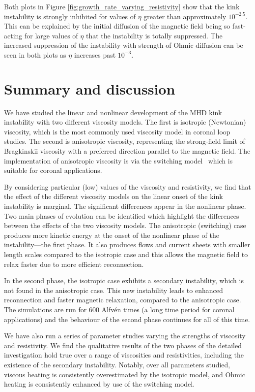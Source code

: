 Both plots in Figure \ref{fig:growth_rate_varying_resistivity} show that the kink instability is strongly inhibited for values of $\eta$ greater than approximately $10^{-2.5}$. This can be explained by the initial diffusion of the magnetic field being so fast-acting for large values of $\eta$ that the instability is totally suppressed. The increased suppression of the instability with strength of Ohmic diffusion can be seen in both plots as $\eta$ increases past $10^{-3}$.

\section{Summary and discussion}
\label{sec:conclusions}

We have studied the linear and nonlinear development of the MHD kink
instability with two different viscosity models. The first is
isotropic (Newtonian) viscosity, which is the most commonly used
viscosity model in coronal loop studies. The second is anisotropic viscosity, representing the strong-field limit of Bragkinskii viscosity with a preferred direction parallel to the magnetic field. The implementation of anisotropic viscosity is via the switching model~\cite{mactaggartBraginskiiMagnetohydrodynamicsArbitrary2017} which is suitable for coronal applications.

By considering particular (low) values of the viscosity and resistivity, we find that the effect of the different viscosity models on the linear onset of the kink instability is marginal. The significant differences appear in the nonlinear phase. Two main phases of evolution can be identified which highlight the differences between the effects of the two viscosity models. The anisotropic (switching) case produces more kinetic energy at the onset of the nonlinear phase of the instability---the first phase. It also produces flows and current sheets with smaller length scales compared to the isotropic case and this allows the magnetic field to relax faster due to more efficient reconnection. 

In the second phase, the isotropic case exhibits a secondary instability, which is not found in the anisotropic case. This new instability leads to enhanced reconnection and faster magnetic relaxation, compared to the anisotropic case.  The simulations are run for $600$ Alfv\'en times (a long time period for coronal applications) and the behaviour of the second phase continues for all of this time.

We have also run a series of parameter studies varying the strengths of viscosity and resistivity. We find the qualitative results of the two phases of the detailed investigation hold true over a range of viscosities and resistivities, including the existence of the secondary instability. Notably, over all parameters studied, viscous heating is consistently overestimated by the isotropic model, and Ohmic heating is consistently enhanced by use of the switching model.

